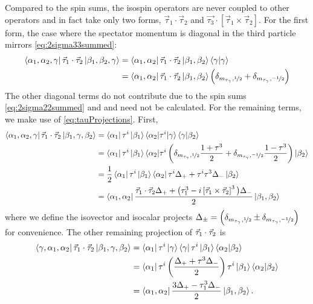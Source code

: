 Compared to the spin sums, the isospin operators are never coupled to other operators and in fact take only two forms, $\vec{\tau}_1\cdot\vec{\tau}_2$ and $\vec{\tau_3}\cdot[\vec{\tau}_1\times\vec{\tau}_2]$. For the first form, the case where the spectator momentum is diagonal in the third particle mirrors \eqref{eq:2sigma33summed}:
\begin{equation}\begin{split}
\bra{\alpha_1,\alpha_2, \gamma } \vec{\tau}_1\cdot \vec{\tau}_2 \ket{\beta_1, \beta_2, \gamma} 
&= \bra{\alpha_1,\alpha_2 } \vec{\tau}_1\cdot \vec{\tau}_2 \ket{\beta_1, \beta_2} \braket{\gamma|\gamma} \\
&= \bra{\alpha_1,\alpha_2 } \vec{\tau}_1\cdot \vec{\tau}_2 \ket{\beta_1, \beta_2} \left(\delta_{m_{\tau_\gamma},\nicefrac{1}{2}}+\delta_{m_{\tau_\gamma},\nicefrac{-1}{2}} \right) 
\end{split}
\end{equation}
The other diagonal terms do not contribute due to the spin sums \eqref{eq:2sigma22summed} and \label{eq:3sigma32summed} and need not be calculated. For the remaining terms, we make use of \eqref{eq:tauProjections}. First,
\begin{equation}\begin{split}
\bra{\alpha_1, \alpha_2, \gamma } \vec{\tau}_1\cdot \vec{\tau}_2 \ket{\beta_1,\gamma,  \beta_2} 
&= \bra{\alpha_1}\tau^i\ket{\beta_1}\braket{\alpha_2 | \tau^i | \gamma} \braket{\gamma | \beta_2} \\
&= \bra{\alpha_1}\tau^i\ket{\beta_1}\braket{\alpha_2 | \tau^i  \left(\delta_{m_{\tau_\gamma},\nicefrac{1}{2}}\dfrac{1+\tau^3}{2}+\delta_{m_{\tau_\gamma},\nicefrac{-1}{2}}\frac{1-\tau^3}{2}\right) | \beta_2} \\
&=\frac{1}{2} \bra{\alpha_1}\tau^i\ket{\beta_1}\bra{\alpha_2} \tau^i  \Delta_+ +\tau^i \tau^3 \Delta_-\ket{\beta_2}\\
&=\bra{\alpha_1,\alpha_2} \frac{\vec{\tau}_1\cdot\vec{\tau}_2\Delta_+ + \big(\tau_1^3-i\left[\vec{\tau}_1\times\vec{\tau}_2\right]^3\big)\Delta_-}{2}\ket{\beta_1,\beta_2}
\end{split}
\end{equation}
where we define the isovector and isocalar projects $\Delta_\pm=\left(\delta_{m_{\tau_\gamma},\nicefrac{1}{2}}\pm\delta_{m_{\tau_\gamma},\nicefrac{-1}{2}} \right)$ for convenience. The other remaining projection of $\vec{\tau}_1\cdot\vec{\tau}_2$ is
\begin{equation}\begin{split}
\bra{\gamma, \alpha_1, \alpha_2 } \vec{\tau}_1\cdot \vec{\tau}_2 \ket{\beta_1,\gamma,  \beta_2} 
&= \bra{\alpha_1}\tau^i\ket{\gamma}\bra{\gamma}\tau^i\ket{\beta_1}\braket{\alpha_2|\beta_2} \\
&= \bra{\alpha_1}\tau^i\left(\frac{\Delta_+ + \tau^3\Delta_-}{2}\right)\tau^i\ket{\beta_1}\braket{\alpha_2|\beta_2} \\
&= \bra{\alpha_1,\alpha_2}\frac{3\Delta_+-\tau_1^3\Delta_-}{2}\ket{\beta_1,\beta_2}.
\end{split}
\end{equation}
